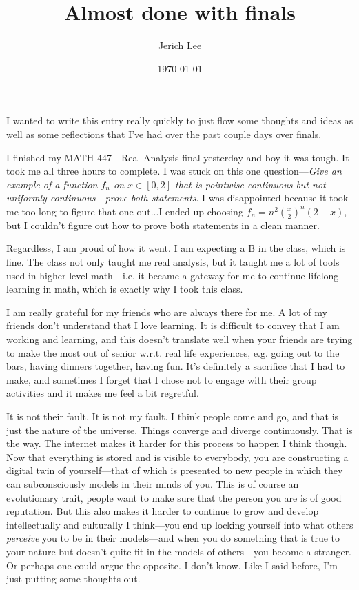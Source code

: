 \documentclass[12pt]{article}
\title{Almost done with finals}
\author{Jerich Lee}
\date{\today}
\theoremstyle{definition} %
\theoremstyle{plain} %
\begin{document}
\maketitle
I wanted to write this entry really quickly to just flow some thoughts and ideas as well as some reflections that I've had over the past couple days over finals.

I finished my MATH 447—Real Analysis final yesterday and boy it was tough. It took me all three hours to complete. I was stuck on this one question—\emph{Give an example of a function $f_{n}$ on $x \in [0,2]$ that is pointwise continuous but not uniformly continuous—prove both statements}. I was disappointed because it took me too long to figure that one out...I ended up choosing  
$f_{n}=n^{2}(\frac{x}{2})^{n}(2-x)$, but I couldn't figure out how to prove both statements in a clean manner.

Regardless, I am proud of how it went. I am expecting a B in the class, which is fine. The class not only taught me real analysis, but it taught me a lot of tools used in higher level math—i.e. it became a gateway for me to continue lifelong-learning in math, which is exactly why I took this class.

I am really grateful for my friends who are always there for me. A lot of my friends don't understand that I love learning. It is difficult to convey that I am working and learning, and this doesn't translate well when your friends are trying to make the most out of senior w.r.t. real life experiences, e.g. going out to the bars, having dinners together, having fun. It's definitely a sacrifice that I had to make, and sometimes I forget that I chose not to engage with their group activities and it makes me feel a bit regretful. 

It is not their fault. It is not my fault. I think people come and go, and that is just the nature of the universe. Things converge and diverge continuously. That is the way. The internet makes it harder for this process to happen I think though. Now that everything is stored and is visible to everybody, you are constructing a digital twin of yourself—that of which is presented to new people in which they can subconsciously models in their minds of you. This is of course an evolutionary trait, people want to make sure that the person you are is of good reputation. But this also makes it harder to continue to grow and develop intellectually and culturally I think—you end up locking yourself into what others \emph{perceive} you to be in their models—and when you do something that is true to your nature but doesn't quite fit in the models of others—you become a stranger. Or perhaps one could argue the opposite. I don't know. Like I said before, I'm just putting some thoughts out. 
\end{document}
